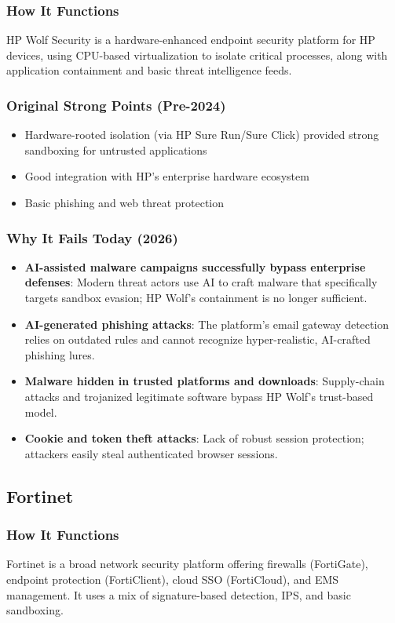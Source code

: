 \documentclass[12pt,letterpaper]{report}
\begin{document}
\subsubsection{How It Functions}
HP Wolf Security is a hardware-enhanced endpoint security platform for HP devices, using CPU-based virtualization to isolate critical processes, along with application containment and basic threat intelligence feeds.

\subsubsection{Original Strong Points (Pre-2024)}
\begin{itemize}
    \item Hardware-rooted isolation (via HP Sure Run/Sure Click) provided strong sandboxing for untrusted applications
    \item Good integration with HP's enterprise hardware ecosystem
    \item Basic phishing and web threat protection
\end{itemize}

\subsubsection{Why It Fails Today (2026)}
\begin{itemize}
    \item \textbf{AI-assisted malware campaigns successfully bypass enterprise defenses}: Modern threat actors use AI to craft malware that specifically targets sandbox evasion; HP Wolf's containment is no longer sufficient.
    \item \textbf{AI-generated phishing attacks}: The platform's email gateway detection relies on outdated rules and cannot recognize hyper-realistic, AI-crafted phishing lures.
    \item \textbf{Malware hidden in trusted platforms and downloads}: Supply-chain attacks and trojanized legitimate software bypass HP Wolf's trust-based model.
    \item \textbf{Cookie and token theft attacks}: Lack of robust session protection; attackers easily steal authenticated browser sessions.
\end{itemize}

\subsection{Fortinet}
\subsubsection{How It Functions}
Fortinet is a broad network security platform offering firewalls (FortiGate), endpoint protection (FortiClient), cloud SSO (FortiCloud), and EMS management. It uses a mix of signature-based detection, IPS, and basic sandboxing.
\end{document}

